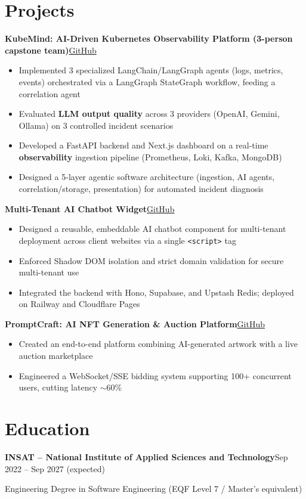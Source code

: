 \documentclass[10pt,a4paper]{article}
\newcommand{\entry}[2]{\vspace{1pt}\noindent\textbf{#1}\hfill{\color{muted}#2}\par}
\newcommand{\gh}[1]{\href{https://github.com/Hsan003/#1}{GitHub}}
\begin{document}
\section{Projects}
\entry{KubeMind: AI-Driven Kubernetes Observability Platform (3-person capstone team)}{\gh{kubemind}}
\begin{itemize}
  \item Implemented 3 specialized LangChain/LangGraph agents (logs, metrics, events) orchestrated via a LangGraph StateGraph workflow, feeding a correlation agent
  \item Evaluated \textbf{LLM output quality} across 3 providers (OpenAI, Gemini, Ollama) on 3 controlled incident scenarios
  \item Developed a FastAPI backend and Next.js dashboard on a real-time \textbf{observability} ingestion pipeline (Prometheus, Loki, Kafka, MongoDB)
  \item Designed a 5-layer agentic software architecture (ingestion, AI agents, correlation/storage, presentation) for automated incident diagnosis
\end{itemize}
\entry{Multi-Tenant AI Chatbot Widget}{\gh{AI-Assistant-Backend}}
\begin{itemize}
  \item Designed a reusable, embeddable AI chatbot component for multi-tenant deployment across client websites via a single \texttt{<script>} tag
  \item Enforced Shadow DOM isolation and strict domain validation for secure multi-tenant use
  \item Integrated the backend with Hono, Supabase, and Upstash Redis; deployed on Railway and Cloudflare Pages
\end{itemize}
\entry{PromptCraft: AI NFT Generation \& Auction Platform}{\gh{prompt-craft-back}}
\begin{itemize}
  \item Created an end-to-end platform combining AI-generated artwork with a live auction marketplace
  \item Engineered a WebSocket/SSE bidding system supporting 100+ concurrent users, cutting latency $\sim$60\%
\end{itemize}

\section{Education}
\entry{INSAT -- National Institute of Applied Sciences and Technology}{Sep 2022 -- Sep 2027 (expected)}
Engineering Degree in Software Engineering (EQF Level 7 / Master's equivalent)
\end{document}
